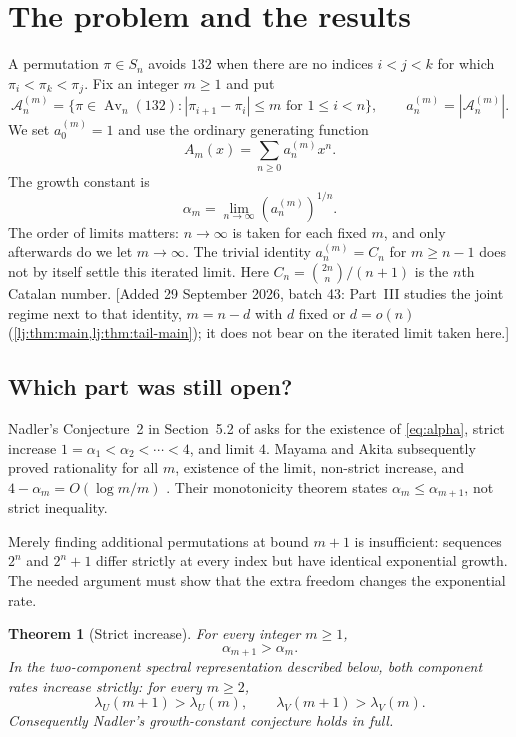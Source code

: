 \documentclass[11pt,a4paper]{article}
\newtheorem{theorem}{Theorem}[section]
\theoremstyle{definition}\newaliascnt{definition}{theorem}
\theoremstyle{remark}\newaliascnt{remark}{theorem}
\newcommand{\Av}{\operatorname{Av}}
\newcommand{\Aclass}{\mathcal A}
\begin{document}
\section{The problem and the results}
\label{sec:results}
A permutation $\pi\in S_n$ avoids $132$ when there are no indices $i<j<k$ for
which $\pi_i<\pi_k<\pi_j$. Fix an integer $m\ge1$ and put
\[
\Aclass_n^{(m)}=\{\pi\in\Av_n(132):|\pi_{i+1}-\pi_i|\le m
                  \text{ for }1\le i<n\},\qquad
 a_n^{(m)}=|\Aclass_n^{(m)}|.
\]
We set $a_0^{(m)}=1$ and use the ordinary generating function
\[
 A_m(x)=\sum_{n\ge0}a_n^{(m)}x^n.
\]
The growth constant is
\begin{equation}
 \alpha_m=\lim_{n\to\infty}(a_n^{(m)})^{1/n}.
 \label{eq:alpha}
\end{equation}
The order of limits matters: $n\to\infty$ is taken for each fixed $m$, and
only afterwards do we let $m\to\infty$. The trivial identity
$a_n^{(m)}=C_n$ for $m\ge n-1$ does not by itself settle this iterated limit.
Here $C_n=\binom{2n}{n}/(n+1)$ is the $n$th Catalan number.
[Added 29 September 2026, batch 43: Part~III studies the joint regime next
to that identity, $m=n-d$ with $d$ fixed or $d=o(n)$
(\cref{lj:thm:main,lj:thm:tail-main}); it does not bear on the iterated
limit taken here.]

\subsection{Which part was still open?}
Nadler's Conjecture~2 in Section~5.2 of \cite{Nadler} asks for the existence of
\eqref{eq:alpha}, strict increase $1=\alpha_1<\alpha_2<\cdots<4$, and limit $4$.
Mayama and Akita subsequently proved rationality for all $m$, existence of the
limit, non-strict increase, and $4-\alpha_m=O(\log m/m)$
\cite[Theorems~2.4, 4.12, and 4.14]{MayamaAkita}. Their monotonicity theorem
states $\alpha_m\le\alpha_{m+1}$, not strict inequality.

Merely finding additional permutations at bound $m+1$ is insufficient:
sequences $2^n$ and $2^n+1$ differ strictly at every index but have identical
exponential growth. The needed argument must show that the extra freedom
changes the exponential rate.

\begin{theorem}[Strict increase]\label{thm:strict-main}
For every integer $m\ge1$,
\[
 \alpha_{m+1}>\alpha_m.
\]
In the two-component spectral representation described below, both component
rates increase strictly: for every $m\ge2$,
\[
 \lambda_U(m+1)>\lambda_U(m),\qquad
 \lambda_V(m+1)>\lambda_V(m).
\]
Consequently Nadler's growth-constant conjecture holds in full.
\end{theorem}
\end{document}
